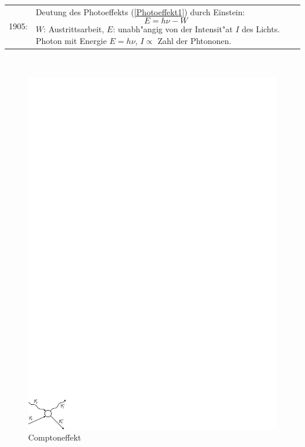 \documentclass[a4paper]{scrartcl}
\begin{document}
\begin{tabular}{l p{400pt}}
1905: &
Deutung des Photoeffekts (\ref{Photoeffekt1}) durch Einstein: 
$$E = h\nu - W$$
$W$: Austrittsarbeit, $E$: unabh"angig von der Intensit"at $I$ des Lichts. Photon mit Energie $E = h \nu$, $I \propto $ Zahl der Phtononen.
\end{tabular}
\\

\begin{figure}[h]
\centering
\includegraphics{002Comptoneffekt} 
\caption{Comptoneffekt}
\label{Comptoneffekt1}
\end{figure}
\end{document}
